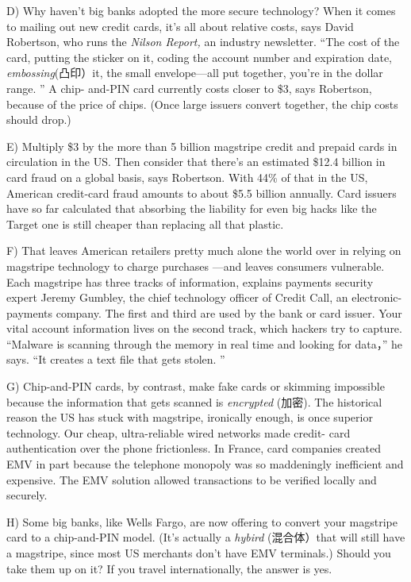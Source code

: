 \documentclass[UTF8,11pt]{ctexart}
\begin{document}
D) Why haven’t big banks adopted the more secure technology? When it comes to mailing out new credit cards, it’s all about relative costs, says David Robertson, who runs the\textit{ Nilson Report,} an industry newsletter. “The cost of the card, putting the sticker on it, coding the account number and expiration date,\textit{ embossing}(凸印）it, the small envelope—all put together, you’re in the dollar range. ” A chip- and-PIN card currently costs closer to \$3, says Robertson, because of the price of chips. (Once large issuers convert together, the chip costs should drop.)


E) Multiply \$3 by the more than 5 billion magstripe credit and prepaid cards in circulation in the US. Then consider that there’s an estimated \$12.4 billion in card fraud on a global basis, says Robertson. With 44\% of that in the US, American credit-card fraud amounts to about \$5.5 billion annually. Card issuers have so far calculated that absorbing the liability for even big hacks like the Target one is still cheaper than replacing all that plastic.


F) That leaves American retailers pretty much alone the world over in relying on magstripe technology to charge purchases —and leaves consumers vulnerable. Each magstripe has three tracks of information, explains payments security expert Jeremy Gumbley, the chief technology officer of Credit Call, an electronic-payments company. The first and third are used by the bank or card issuer. Your vital account information lives on the second track, which hackers try to capture. “Malware is scanning through the memory in real time and looking for data，” he says. “It creates a text file that gets stolen. ”


G) Chip-and-PIN cards, by contrast, make fake cards or skimming impossible because the information that gets scanned is \textit{encrypted} (加密). The historical reason the US has stuck with magstripe, ironically enough, is once superior technology. Our cheap, ultra-reliable wired networks made credit- card authentication over the phone frictionless. In France, card companies created EMV in part because the telephone monopoly was so maddeningly inefficient and expensive. The EMV solution allowed transactions to be verified locally and securely.


H) Some big banks, like Wells Fargo, are now offering to convert your magstripe card to a chip-and-PIN model. (It’s actually a \textit{hybird} (混合体）that will still have a magstripe, since most US merchants don’t have EMV terminals.) Should you take them up on it? If you travel internationally, the answer is yes.
\end{document}

